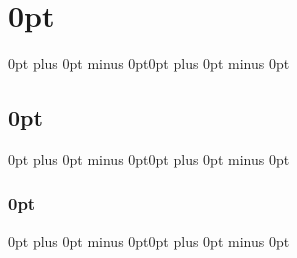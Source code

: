 \usepackage{amsfonts, amsmath, amsthm, amssymb} %
\usepackage{graphicx} %
\usepackage{booktabs} %
\usepackage{wrapfig} %
\usepackage[labelfont=bf]{caption} %
\usepackage[top=0.5in,bottom=0.5in,left=0.5in,right=0.5in]{geometry} %
\pagestyle{empty} %
\usepackage[scaled]{helvet} %
\renewcommand*\familydefault{\sfdefault} %
\usepackage[T1]{fontenc}
\usepackage{ulem}
\usepackage{xcolor}
\usepackage{cite}
\usepackage{sectsty}
\usepackage{siunitx}
\usepackage{xfrac}
\usepackage[colorlinks,linkcolor=blue,anchorcolor=blue,citecolor=blue]{hyperref}
\sectionfont{\color{blue}} 
\usepackage[compact]{titlesec}
\usepackage{subfig}
\captionsetup{belowskip=0pt,aboveskip=0pt}
\titlespacing\section{0pt}{0pt plus 0pt minus 0pt}{0pt plus 0pt minus 0pt}
\titlespacing\subsection{0pt}{0pt plus 0pt minus 0pt}{0pt plus 0pt minus 0pt}
\titlespacing\subsubsection{0pt}{0pt plus 0pt minus 0pt}{0pt plus 0pt minus 0pt}
\usepackage[labelformat=empty]{caption} %
\usepackage{enumitem} %
\usepackage{etoolbox}
\usepackage[parfill]{parskip}
\usepackage{pdfpages} %
\usepackage{fancyhdr}
\fancyhf{} %
\renewcommand{\headrulewidth}{0pt}
